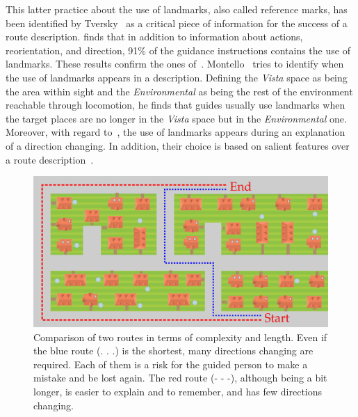 This latter practice about the use of landmarks, also called reference marks, has been identified by Tversky~\cite{tversky_1999_pictorial} as a critical piece of information for the success of a route description. \cite{tversky_1998_space} finds that in addition to information about actions, reorientation, and direction, 91\% of the guidance instructions contains the use of landmarks. These results confirm the ones of~\cite{denis_1997_description}. Montello~\cite{montello_1993_scale} tries to identify when the use of landmarks appears in a description. Defining the \textit{Vista} space as being the area within sight and the \textit{Environmental} as being the rest of the environment reachable through locomotion, he finds that guides usually use landmarks when the target places are no longer in the \textit{Vista} space but in the \textit{Environmental} one. Moreover, with regard to~\cite{tversky_1999_pictorial}, the use of landmarks appears during an explanation of a direction changing. In addition, their choice is based on salient features over a route description~\cite{nothegger_2004_selection}.

\begin{figure}[ht!]
\centering
\includegraphics[scale=0.22]{figures/chapter3/landscape/landscape.png}
\caption{\label{fig:chap3_shortest} Comparison of two routes in terms of complexity and length. Even if the blue route (. . .) is the shortest, many directions changing are required. Each of them is a risk for the guided person to make a mistake and be lost again. The red route (- - -), although being a bit longer, is easier to explain and to remember, and has few directions changing.}
\end{figure}

